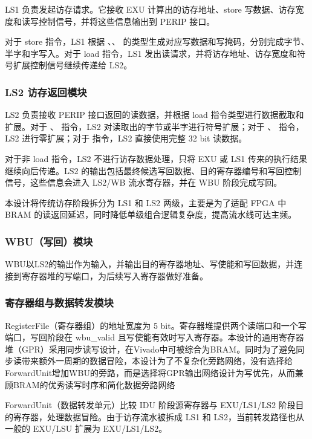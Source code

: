 \documentclass[UTF8,a4paper,zihao=-4]{ctexart}
\newcommand{\code}[1]{\texttt{\detokenize{#1}}}
\begin{document}
LS1 负责发起访存请求。它接收 EXU 计算出的访存地址、store 写数据、访存宽度和读写控制信号，并将这些信息输出到 PERIP 接口。

对于 store 指令，LS1 根据 \code{sb}、\code{sh}、\code{sw} 的类型生成对应写数据和写掩码，分别完成字节、半字和字写入。对于 load 指令，LS1 发出读请求，并将访存地址、访存宽度和符号扩展控制信号继续传递给 LS2。

\subsubsection{LS2 访存返回模块}

LS2 负责接收 PERIP 接口返回的读数据，并根据 load 指令类型进行数据截取和扩展。对于 \code{lb}、\code{lh} 指令，LS2 对读取出的字节或半字进行符号扩展；对于 \code{lbu}、\code{lhu} 指令，LS2 进行零扩展；对于 \code{lw} 指令，LS2 直接使用完整 32 bit 读数据。

对于非 load 指令，LS2 不进行访存数据处理，只将 EXU 或 LS1 传来的执行结果继续向后传递。LS2 的输出包括最终候选写回数据、目的寄存器编号和写回控制信号，这些信息会进入 LS2/WB 流水寄存器，并在 WBU 阶段完成写回。

本设计将传统访存阶段拆分为 LS1 和 LS2 两级，主要是为了适配 FPGA 中 BRAM 的读返回延迟，同时降低单级组合逻辑复杂度，提高流水线可达主频。

\subsubsection{WBU（写回）模块}

WBU以LS2的输出作为输入，并输出目的寄存器地址、写使能和写回数据，并连接到寄存器堆的写端口，为后续写入寄存器做好准备。

\subsubsection{寄存器组与数据转发模块}

RegisterFile（寄存器组）的地址宽度为 5 bit。寄存器堆提供两个读端口和一个写端口，写回阶段在 wbu\_valid 且写使能有效时写入寄存器。本设计的通用寄存器堆（GPR）采用同步读写设计，在Vivado中可被综合为BRAM。同时为了避免同步读带来额外一周期的数据冒险，本设计为了不复杂化旁路网络，没有选择给ForwardUnit增加WBU的旁路，而是选择将GPR输出网络设计为写优先，从而兼顾BRAM的优秀读写时序和简化数据旁路网络

ForwardUnit（数据转发单元）比较 IDU 阶段源寄存器与 EXU/LS1/LS2 阶段目的寄存器，处理数据冒险。由于访存流水被拆成 LS1 和 LS2，当前转发路径也从一般的 EXU/LSU 扩展为 EXU/LS1/LS2。
\end{document}
